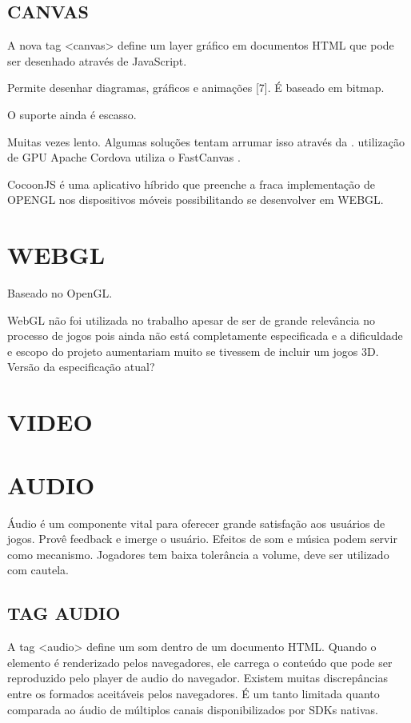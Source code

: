 \documentclass[11pt,a4paper]{article}
\begin{document}
\subsection{CANVAS}

A nova tag <canvas> define um layer gráfico em documentos HTML que pode
ser desenhado através de JavaScript.

Permite desenhar diagramas, gráficos e animações [7]. É baseado em
bitmap.

O suporte ainda é escasso.

Muitas vezes lento. Algumas soluções tentam arrumar isso através da .
utilização de GPU Apache Cordova utiliza o FastCanvas                .

CocoonJS é uma aplicativo híbrido que preenche a fraca implementação
de OPENGL nos dispositivos móveis possibilitando se desenvolver em
WEBGL.

\section{WEBGL}

Baseado no OpenGL.

WebGL não foi utilizada no trabalho apesar de ser de grande
relevância no processo de jogos pois ainda não está completamente
especificada e a dificuldade e escopo do projeto aumentariam muito se
tivessem de incluir um jogos 3D. Versão da especificação atual?

\section{VIDEO}

\section{AUDIO}

Áudio é um componente vital para oferecer grande satisfação aos
usuários de jogos. Provê feedback e imerge o usuário. Efeitos de som
e música podem servir como mecanismo. Jogadores tem baixa tolerância a
volume, deve ser utilizado com cautela.

\subsection{TAG AUDIO}

A tag <audio> define um som dentro de um documento HTML. Quando o
elemento é renderizado pelos navegadores, ele carrega o conteúdo
que pode ser reproduzido pelo player de audio do navegador. Existem
muitas discrepâncias entre os formados aceitáveis pelos navegadores.
É um tanto limitada quanto comparada ao áudio de múltiplos canais
disponibilizados por SDKs nativas.
\end{document}
